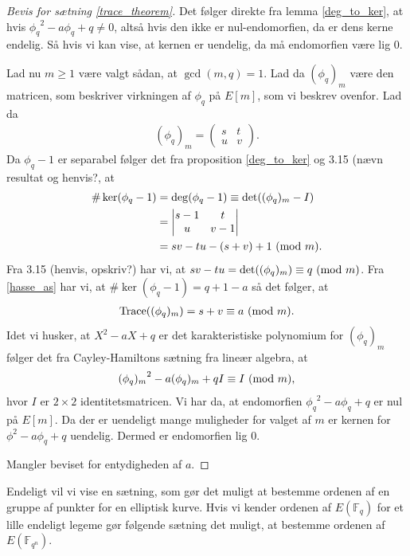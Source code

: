 \begin{proof}[Bevis for sætning \ref{trace_theorem}]
Det følger direkte fra lemma \ref{deg_to_ker}, at hvis ${\phi_q}^2 -a \phi_q + q \neq 0$, altså hvis den ikke er nul-endomorfien, da er dens kerne endelig. Så hvis vi kan vise, at kernen er uendelig, da må endomorfien være lig $0$.

Lad nu $m \geq 1$ være valgt sådan, at $\gcd(m, q) = 1$. Lad da $(\phi_q)_m$ være den matricen, som beskriver virkningen af $\phi_q$ på $E[m]$, som vi beskrev ovenfor. Lad da
\begin{align*}
	(\phi_q)_m = \left( 
	\begin{matrix}
		s & t \\
		u & v
	\end{matrix} \right).
\end{align*}
Da $\phi_q - 1$ er separabel følger det fra proposition \ref{deg_to_ker} og 3.15 (nævn resultat og henvis?, at
\begin{align*}
	\# \ker (\phi_q - 1) &= \deg(\phi_q - 1) \equiv \det((\phi_q)_m - I) \\ 
	&= 
	\left| \begin{matrix}
		s-1 & t \\
		u & v - 1 
	\end{matrix} \right| \\
	&= sv - tu - (s + v) + 1 \ (\mathrm{mod} \ m).
\end{align*}
Fra 3.15 (henvis, opskriv?) har vi, at $sv-tu = \det((\phi_q)_m) \equiv q \ (\mathrm{mod} \ m)$. Fra \eqref{hasse_as} har vi, at 
$\# \ker(\phi_q - 1) = q + 1 - a$ så det følger, at 
\begin{align*}
	\text{Trace}((\phi_q)_m) = s + v \equiv a \ (\mathrm{mod} \ m).
\end{align*}
Idet vi husker, at $X^2 - aX + q$ er det karakteristiske polynomium for $(\phi_q)_m$ følger det fra
Cayley-Hamiltons sætning fra lineær algebra, at
\begin{align*}
	{(\phi_q)_m}^2 - a(\phi_q)_m + qI \equiv I \ (\mathrm{mod} \ m),
\end{align*}
hvor $I$ er $2 \times 2$ identitetsmatricen. Vi har da, at endomorfien ${\phi_q}^2 -a\phi_q + q$ er nul på $E[m]$. Da der er uendeligt mange muligheder for valget af $m$ er kernen for ${\phi}^2 - a\phi_q + q$ uendelig. Dermed er endomorfien lig $0$.

Mangler beviset for entydigheden af $a$.
\end{proof}

Endeligt vil vi vise en sætning, som gør det muligt at bestemme ordenen af en gruppe af punkter for en elliptisk kurve. Hvis vi kender ordenen af $E(\mathbb{F}_q)$ for et lille endeligt legeme gør følgende sætning det muligt, at bestemme ordenen af $E(\mathbb{F}_{q^n})$.

